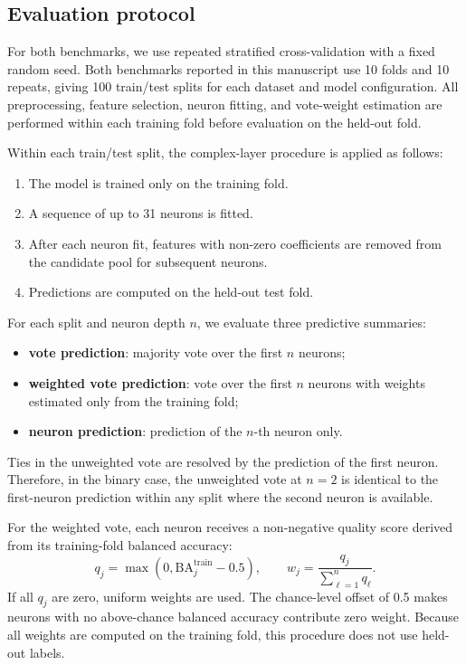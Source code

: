 \subsection*{Evaluation protocol}
For both benchmarks, we use repeated stratified cross-validation with a fixed random seed.
Both benchmarks reported in this manuscript use 10 folds and 10 repeats, giving 100 train/test splits for
each dataset and model configuration.
All preprocessing, feature selection, neuron fitting, and vote-weight estimation are performed within each
training fold before evaluation on the held-out fold.

Within each train/test split, the complex-layer procedure is applied as follows:
\begin{enumerate}[noitemsep]
\item The model is trained only on the training fold.
\item A sequence of up to 31 neurons is fitted.
\item After each neuron fit, features with non-zero coefficients are removed from the candidate pool
for subsequent neurons.
\item Predictions are computed on the held-out test fold.
\end{enumerate}

For each split and neuron depth $n$, we evaluate three predictive summaries:
\begin{itemize}[noitemsep]
\item \textbf{vote prediction}: majority vote over the first $n$ neurons;
\item \textbf{weighted vote prediction}: vote over the first $n$ neurons with weights estimated only from the
training fold;
\item \textbf{neuron prediction}: prediction of the $n$-th neuron only.
\end{itemize}
Ties in the unweighted vote are resolved by the prediction of the first neuron. Therefore, in the binary case,
the unweighted vote at $n=2$ is identical to the first-neuron prediction within any split where the second neuron
is available.

For the weighted vote, each neuron receives a non-negative quality score derived from its training-fold
balanced accuracy:
\[
q_j=\max\left(0,\mathrm{BA}^{\mathrm{train}}_j-0.5\right),
\qquad
w_j=\frac{q_j}{\sum_{\ell=1}^{n} q_\ell}.
\]
If all $q_j$ are zero, uniform weights are used. The chance-level offset of 0.5 makes neurons with no
above-chance balanced accuracy contribute zero weight. Because all weights are computed on the training fold,
this procedure does not use held-out labels.

